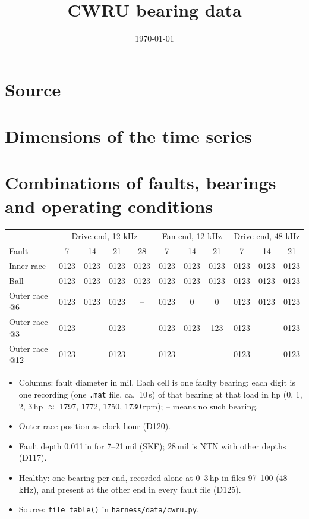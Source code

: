 \documentclass[11pt,a4paper]{article}
\title{CWRU bearing data}
\author{}
\date{\today}
\begin{document}
\maketitle

\section{Source}

\section{Dimensions of the time series}

\section{Combinations of faults, bearings and operating conditions}

\begin{table}[h]
\centering
\small
\begin{tabular}{l cccc @{\qquad} ccc @{\qquad} ccc}
\toprule
 & \multicolumn{4}{c}{Drive end, 12 kHz} & \multicolumn{3}{c}{Fan end, 12 kHz} & \multicolumn{3}{c}{Drive end, 48 kHz} \\
Fault & 7 & 14 & 21 & 28 & 7 & 14 & 21 & 7 & 14 & 21 \\
\midrule
Inner race     & 0123 & 0123 & 0123 & 0123 & 0123 & 0123 & 0123 & 0123 & 0123 & 0123 \\
Ball           & 0123 & 0123 & 0123 & 0123 & 0123 & 0123 & 0123 & 0123 & 0123 & 0123 \\
Outer race @6  & 0123 & 0123 & 0123 & --   & 0123 & 0    & 0    & 0123 & 0123 & 0123 \\
Outer race @3  & 0123 & --   & 0123 & --   & 0123 & 0123 & 123  & 0123 & --   & 0123 \\
Outer race @12 & 0123 & --   & 0123 & --   & 0123 & --   & --   & 0123 & --   & 0123 \\
\bottomrule
\end{tabular}
\end{table}

\begin{itemize}
  \item Columns: fault diameter in mil. Each cell is one faulty bearing; each digit
        is one recording (one \texttt{.mat} file, ca.\ 10\,s) of that bearing at that
        load in hp (0, 1, 2, 3\,hp $\approx$ 1797, 1772, 1750, 1730\,rpm); -- means no
        such bearing.
  \item Outer-race position as clock hour (D120).
  \item Fault depth 0.011\,in for 7--21\,mil (SKF); 28\,mil is NTN with other depths (D117).
  \item Healthy: one bearing per end, recorded alone at 0--3\,hp in files 97--100
        (48\,kHz), and present at the other end in every fault file (D125).
  \item Source: \texttt{file\_table()} in \texttt{harness/data/cwru.py}.
\end{itemize}
\end{document}
